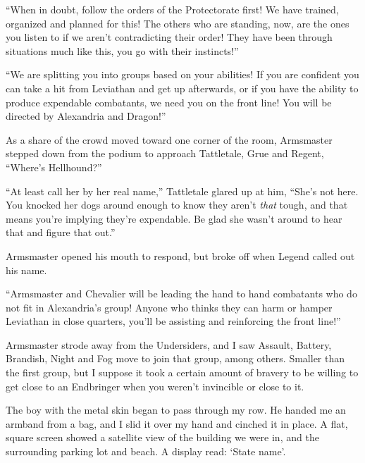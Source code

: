 ``When in doubt, follow the orders of the Protectorate first!  We have trained, organized and planned for this!  The others who are standing, now, are the ones you listen to if we aren't contradicting their order!  They have been through situations much like this, you go with their instincts!''



``We are splitting you into groups based on your abilities!  If you are confident you can take a hit from Leviathan and get up afterwards, or if you have the ability to produce expendable combatants, we need you on the front line!  You will be directed by Alexandria and Dragon!''



As a share of the crowd moved toward one corner of the room, Armsmaster stepped down from the podium to approach Tattletale, Grue and Regent, ``Where's Hellhound?''



``At least call her by her real name,'' Tattletale glared up at him, ``She's not here.  You knocked her dogs around enough to know they aren't \emph{that} tough, and that means you're implying they're expendable.  Be glad she wasn't around to hear that and figure that out.''



Armsmaster opened his mouth to respond, but broke off when Legend called out his name.



``Armsmaster and Chevalier will be leading the hand to hand combatants who do not fit in Alexandria's group!  Anyone who thinks they can harm or hamper Leviathan in close quarters, you'll be assisting and reinforcing the front line!''



Armsmaster strode away from the Undersiders, and I saw Assault, Battery, Brandish, Night and Fog move to join that group, among others.  Smaller than the first group, but I suppose it took a certain amount of bravery to be willing to get close to an Endbringer when you weren't invincible or close to it.



The boy with the metal skin began to pass through my row.  He handed me an armband from a bag, and I slid it over my hand and cinched it in place.  A flat, square screen showed a satellite view of the building we were in, and the surrounding parking lot and beach.  A display read: `State name'.



